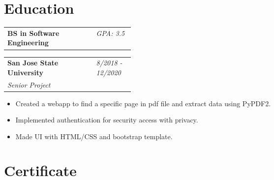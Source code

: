 \documentclass[11pt]{article} %
\begin{document}
\begin{paracol}{2}
{}
\medskip
\medskip

\section{Education} 




\begin{supertabular}{p{.78\linewidth}p{0.3\linewidth}}
   \Large\textbf{BS in Software Engineering} \raggedright & \textit{GPA: 3.5} \\ 
\end{supertabular}
\begin{supertabular}{p{.65\linewidth}p{0.3\linewidth}}
   \textbf{San Jose State University} \raggedright & \textit{8/2018 - 12/2020} \\
   \textit{Senior Project} \\
\end{supertabular}
\begin{itemize}
	\setlength\itemsep{-0.5em}
    \item Created a webapp to find a specific page in pdf file and extract data using PyPDF2.
    \item Implemented authentication for security access with privacy.
    \item Made UI with HTML/CSS and bootstrap template.
\end{itemize}

\section{Certificate} 


\end{paracol}
\end{document}
